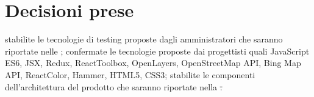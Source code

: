 \documentclass[a4paper,11pt]{article}
\begin{document}
	\section{Decisioni prese}
	\begin{itemize}
		\itemVI stabilite le tecnologie di testing proposte dagli amministratori che saranno riportate nelle \ndp;
		\itemVI confermate le tecnologie proposte dai progettisti quali JavaScript ES6, JSX, Redux, ReactToolbox, OpenLayers, OpenStreetMap API, Bing Map API, ReactColor, Hammer, HTML5, CSS3;
		\itemVI stabilite le componenti dell'architettura del prodotto che saranno riportate nella \st.
	\end{itemize}
\end{document}
